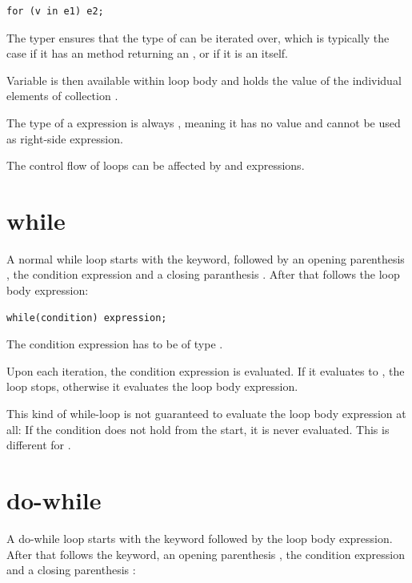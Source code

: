 \documentclass{haxe}
\begin{document}
\begin{lstlisting}
for (v in e1) e2;
\end{lstlisting}

The typer ensures that the type of  can be iterated over, which is typically the case if it has an  method returning an , or if it is an  itself.

Variable  is then available within loop body  and holds the value of the individual elements of collection .

The type of a  expression is always , meaning it has no value and cannot be used as right-side expression.

The control flow of loops can be affected by  and  expressions.

\section{while}
\label{expression-while}

A normal while loop starts with the  keyword, followed by an opening parenthesis \expr{(}, the condition expression and a closing paranthesis \expr{)}. After that follows the loop body expression:

\begin{lstlisting}
while(condition) expression;
\end{lstlisting}

The condition expression has to be of type .

Upon each iteration, the condition expression is evaluated. If it evaluates to , the loop stops, otherwise it evaluates the loop body expression.


This kind of while-loop is not guaranteed to evaluate the loop body expression at all: If the condition does not hold from the start, it is never evaluated. This is different for .

\section{do-while}
\label{expression-do-while}

A do-while loop starts with the  keyword followed by the loop body expression. After that follows the  keyword, an opening parenthesis \expr{(}, the condition expression and a closing parenthesis \expr{)}:
\end{document}

